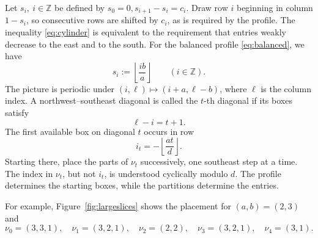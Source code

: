 \documentclass[12pt,reqno]{amsart}
\numberwithin{equation}{section}
\theoremstyle{definition}
\theoremstyle{remark}
\theoremstyle{plain}
\newcommand{\ZZ}{\mathbb Z}
\begin{document}
Let $s_i,\ i\in \ZZ$ be defined by $s_0=0, s_{i+1}-s_i=c_i$. Draw row $i$ beginning in column $1-s_i$, so consecutive rows are shifted by $c_i$, as is required by the profile. The inequality \eqref{eq:cylinder} is equivalent to the requirement that entries weakly decrease to the east and to the south. For the balanced profile \eqref{eq:balanced}, we have
\[
 s_i:=\left\lfloor\frac{ib}{a}\right\rfloor\qquad(i\in\ZZ).
\]
The picture is periodic under
$(i,\ell)\mapsto(i+a,\ell-b)$, where $\ell$ is the column index.  A northwest--southeast diagonal is called the $t$-th diagonal if its boxes satisfy
\begin{equation}\label{eq:diagonalnumber}
 \ell-i=t+1.
\end{equation}
The first available box on diagonal $t$ occurs in row
\begin{equation}\label{eq:firstrow}
 i_t=-\left\lfloor\frac{at}{d}\right\rfloor.
\end{equation}
Starting there, place the parts of $\nu_t$ successively, one southeast step at a time. The index in $\nu_t$, but not $i_t$, is understood cyclically modulo $d$. The profile determines the starting boxes, while the partitions determine the entries.

For example, Figure~\ref{fig:largeslices} shows the placement for $(a,b)=(2,3)$ and
\[
 \nu_0=(3,3,1),\quad \nu_1=(3,2,1),\quad \nu_2=(2,2),\quad
 \nu_3=(3,2,1),\quad \nu_4=(3,1).
\]
\end{document}
